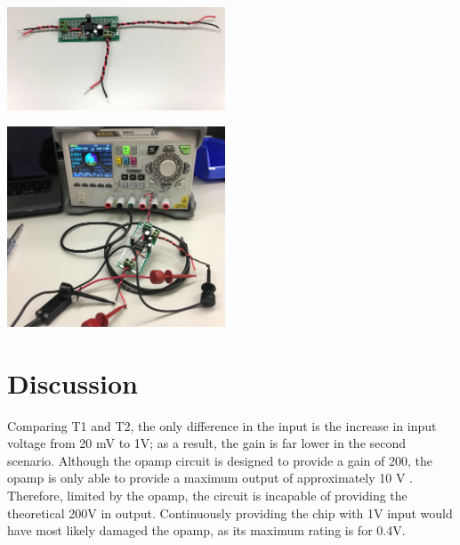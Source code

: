 \documentclass[journal]{IEEEtran}
\begin{document}
\begingroup
    \centering
    \medskip
    \includegraphics[width=245]{images/lab6_4.JPG}
    \label{fig:board1}
    \medskip
\endgroup

\begingroup
\medskip
    \centering
    \includegraphics[width=245]{images/lab6_3.JPG}
    \label{fig:board2}
    \medskip
\endgroup

\section{Discussion}

\noindent Comparing T1 and T2, the only difference in the input is the increase in input voltage from 20 mV to 1V; as a result, the gain is far lower in the second scenario. Although the opamp circuit is designed to provide a gain of 200, the opamp is only able to provide a maximum output of approximately 10 V \cite{tidata}. Therefore, limited by the opamp, the circuit is incapable of providing the theoretical 200V in output. Continuously providing the chip with 1V input would have most likely damaged the opamp, as its maximum rating is for 0.4V.\\ 
\end{document}
